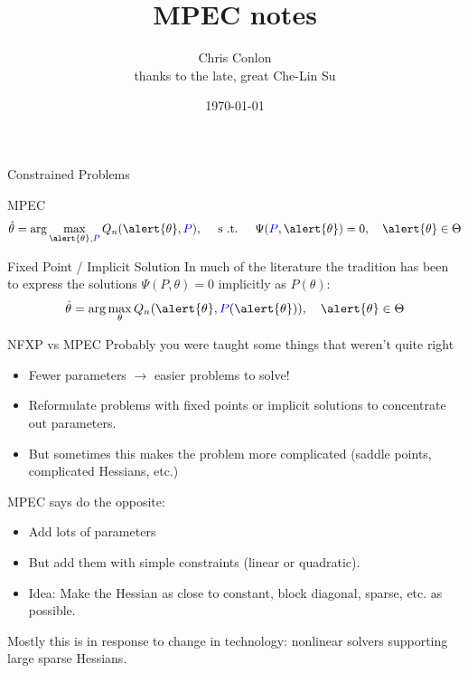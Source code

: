 \documentclass[xcolor=pdftex,dvipsnames,table,mathserif,aspectratio=169]{beamer}
\begin{document}
\title{MPEC notes}
\author{Chris Conlon\\
 thanks to the late, great Che-Lin Su}
\date{\today}
\footnotesize
\frame{\titlepage}


\begin{frame}{Constrained Problems}
\begin{block}{MPEC}
\begin{align*}
\hat{\theta} = \arg \max_{\alert{\theta},\textcolor{blue}{P}} Q_n(\alert{\theta},\textcolor{blue}{P}), \quad  \mbox{ s .t. } \quad \Psi(\textcolor{blue}{P},\alert{\theta}) =0,  \quad \alert{\theta} \in \Theta
\end{align*} 
\end{block}
\pause
\begin{block}{Fixed Point / Implicit Solution}
In much of the literature the tradition has been to express the solutions $\Psi(P,\theta) =0$ implicitly as $P(\theta)$:
\begin{align*}
\hat{\theta} = \arg \max_{\theta} Q_n(\alert{\theta},\textcolor{blue}{P}(\alert{\theta})),  \quad \alert{\theta} \in \Theta
\end{align*}
\end{block}
\end{frame}

\begin{frame}{NFXP vs MPEC}
Probably you were taught some things that weren't quite right
\begin{itemize}
\item Fewer parameters $\rightarrow$ easier problems to solve!
\item Reformulate problems with fixed points or implicit solutions to \alert{concentrate out} parameters.
\item But sometimes this makes the problem more complicated (saddle points, complicated Hessians, etc.)
\end{itemize}
MPEC says do the opposite:
\begin{itemize}
\item Add lots of parameters
\item But add them with simple constraints (linear or quadratic).
\item Idea: Make the Hessian as close to constant, block diagonal, sparse, etc. as possible.
\end{itemize}
Mostly this is in response to change in technology: nonlinear solvers supporting large sparse Hessians.
\end{frame}
\end{document}
